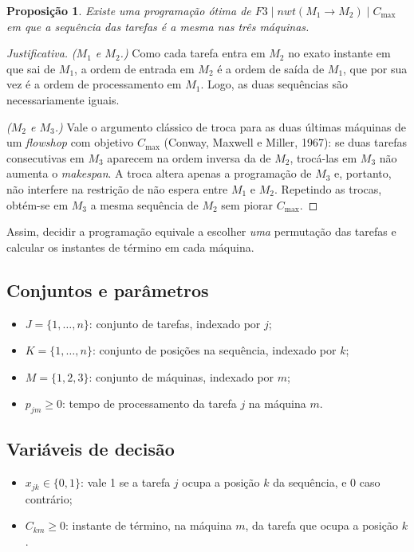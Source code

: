 \documentclass[11pt,a4paper]{article}
\newtheorem{proposicao}{Proposição}
\begin{document}
\begin{proposicao}
Existe uma programação ótima de $F3 \mid \mathit{nwt}(M_1\to M_2) \mid C_{\max}$
em que a sequência das tarefas é a mesma nas três máquinas.
\end{proposicao}
\begin{proof}[Justificativa]
\emph{($M_1$ e $M_2$.)} Como cada tarefa entra em $M_2$ no exato instante em que
sai de $M_1$, a ordem de entrada em $M_2$ é a ordem de saída de $M_1$, que por
sua vez é a ordem de processamento em $M_1$. Logo, as duas sequências são
necessariamente iguais.

\emph{($M_2$ e $M_3$.)} Vale o argumento clássico de troca para as duas últimas
máquinas de um \emph{flowshop} com objetivo $C_{\max}$ (Conway, Maxwell e Miller,
1967): se duas tarefas consecutivas em $M_3$ aparecem na ordem inversa da de
$M_2$, trocá-las em $M_3$ não aumenta o \emph{makespan}. A troca altera apenas a
programação de $M_3$ e, portanto, não interfere na restrição de não espera entre
$M_1$ e $M_2$. Repetindo as trocas, obtém-se em $M_3$ a mesma sequência de $M_2$
sem piorar $C_{\max}$.
\end{proof}

Assim, decidir a programação equivale a escolher \emph{uma} permutação das
tarefas e calcular os instantes de término em cada máquina.

\subsection{Conjuntos e parâmetros}

\begin{itemize}
  \item $J = \{1,\dots,n\}$: conjunto de tarefas, indexado por $j$;
  \item $K = \{1,\dots,n\}$: conjunto de posições na sequência, indexado por $k$;
  \item $M = \{1,2,3\}$: conjunto de máquinas, indexado por $m$;
  \item $p_{jm} \ge 0$: tempo de processamento da tarefa $j$ na máquina $m$.
\end{itemize}

\subsection{Variáveis de decisão}

\begin{itemize}
  \item $x_{jk} \in \{0,1\}$: vale 1 se a tarefa $j$ ocupa a posição $k$ da
        sequência, e 0 caso contrário;
  \item $C_{km} \ge 0$: instante de término, na máquina $m$, da tarefa que ocupa
        a posição $k$.
\end{itemize}
\end{document}
